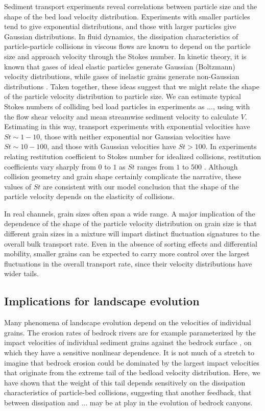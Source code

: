Sediment transport experiments reveal correlations between particle size and the shape of the bed load velocity distribution.
Experiments with smaller particles tend to give exponential distributions, and those with larger particles give Gaussian distributions.
In fluid dynamics, the dissipation characteristics of particle-particle collisions in viscous flows are known to depend on the particle size and approach velocity through the Stokes number. 
In kinetic theory, it is known that gases of ideal elastic particles generate Gaussian (Boltzmann) velocity distributions, while gases of inelastic grains generate non-Gaussian distributions \citep{Chapman1970,Brilliantov2004}.
Taken together, these ideas suggest that we might relate the shape of the particle velocity distribution to particle size.
We can estimate typical Stokes numbers of colliding bed load particles in experiments as $...$, using with the flow shear velocity and mean streamwise sediment velocity to calculate $V$. Estimating in this way, transport experiments with exponential velocities have $St \sim 1-10$, those with neither exponential nor Gaussian velocities have $St \sim 10-100$, and those with Gaussian velocities have $St > 100$.
In experiments relating restitution coefficient to Stokes number for idealized collisions, restitution coefficients vary sharply from $0$ to $1$ as $St$ ranges from $1$ to $500$ \cite{Marshall2011,Joseph2001,Yang2006}.
Although collision geometry and grain shape certainly complicate the narrative, these values of $St$ are consistent with our model conclusion that the shape of the particle velocity depends on the elasticity of collisions.

In real channels, grain sizes often span a wide range. A major implication of the dependence of the shape of the particle velocity distribution on grain size is that different grain sizes in a mixture will impart distinct fluctuation signatures to the overall bulk transport rate. Even in the absence of sorting effects and differential mobility, smaller grains can be expected to carry more control over the largest fluctuations in the overall transport rate, since their velocity distributions have wider tails. 

\subsection{Implications for landscape evolution}

Many phenomena of landscape evolution depend on the velocities of individual grains.
The erosion rates of bedrock rivers are for example parameterized by the impact velocities of individual sediment grains against the bedrock surface \citep{Sklar2004,Tingian}, on which they have a sensitive nonlinear dependence.
It is not much of a stretch to imagine that bedrock erosion could be dominated by the largest impact velocities that originate from the extreme tail of the bedload velocity distribution. Here, we have shown that the weight of this tail depends sensitively on the dissipation characteristics of particle-bed collisions, suggesting that another feedback, that between dissipation and ... may be at play in the evolution of bedrock canyons.

